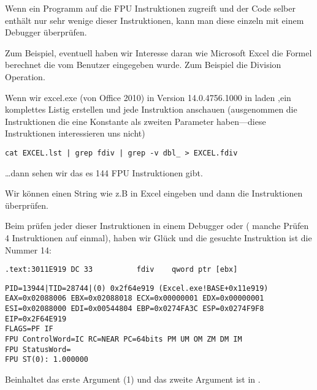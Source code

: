 
Wenn ein Programm auf die FPU Instruktionen zugreift und der Code selber enth\"alt nur sehr wenige
dieser Instruktionen, kann man diese einzeln mit einem Debugger \"uberpr\"ufen.

\par Zum Beispiel, eventuell haben wir Interesse daran wie Microsoft Excel die Formel berechnet die vom Benutzer eingegeben wurde.
Zum Beispiel die Division Operation.

\myindex{\GrepUsage}

Wenn wir excel.exe (von Office 2010) in Version 14.0.4756.1000 in \IDA laden ,ein komplettes
Listig erstellen und jede \FDIV Instruktion anschauen (ausgenommen die Instruktionen die
eine Konstante als zweiten Parameter haben---diese Instruktionen interessieren uns nicht)

\begin{lstlisting}
cat EXCEL.lst | grep fdiv | grep -v dbl_ > EXCEL.fdiv
\end{lstlisting}

\dots dann sehen wir das es 144 FPU Instruktionen gibt.

\par Wir k\"onnen einen String wie z.B  in Excel eingeben und dann die Instruktionen \"uberpr\"ufen.


\par Beim pr\"ufen jeder dieser Instruktionen in einem Debugger oder \tracer
( manche Pr\"ufen 4 Instruktionen auf einmal), haben wir Gl\"uck und die
gesuchte Instruktion ist die Nummer 14:

\begin{lstlisting}[style=customasmx86]
.text:3011E919 DC 33          fdiv    qword ptr [ebx]
\end{lstlisting}

\begin{lstlisting}
PID=13944|TID=28744|(0) 0x2f64e919 (Excel.exe!BASE+0x11e919)
EAX=0x02088006 EBX=0x02088018 ECX=0x00000001 EDX=0x00000001
ESI=0x02088000 EDI=0x00544804 EBP=0x0274FA3C ESP=0x0274F9F8
EIP=0x2F64E919
FLAGS=PF IF
FPU ControlWord=IC RC=NEAR PC=64bits PM UM OM ZM DM IM 
FPU StatusWord=
FPU ST(0): 1.000000
\end{lstlisting}

 Beinhaltet das erste Argument (1) und das zweite Argument ist in \TT{[EBX]}.\\
\\

